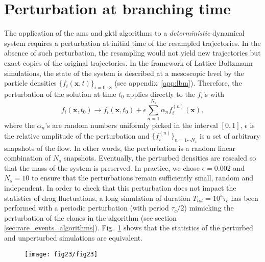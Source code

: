 \section{Perturbation at branching time}
\label{app:perturb_branching_time}
The application  of the \ac{ams} and \ac{gktl} algorithms to a \emph{deterministic} dynamical system requires a perturbation at initial time of the
resampled trajectories. In the absence of such perturbation, the resampling would not yield new trajectories but exact copies of the original trajectories.
In the framework of Lattice Boltzmann simulations, the state of the system is described at a mesoscopic level by the particle densities $\{f_i(\mathbf{x},t)\}_{i=0\cdots8}$ (see appendix~\ref{app:lbm}).
%
Therefore, the perturbation of the solution at time $t_0$ applies directly to the $f_i$'s with 
\begin{equation}
f_{i}(\mathbf{x},t_0) \longrightarrow f_i(\mathbf{x},t_0) + \epsilon \sum_{n=1}^{N_s} \alpha_{n}f_{i}^{(n)}(\mathbf{x}),
\label{eq:perturb_pop}
\end{equation}
where the $\alpha_n$'s are random numbers uniformly picked in the interval $[0,1]$, $\epsilon$ is the relative amplitude of the perturbation and $\{f_i^{(n)}\}_{n=1 \cdots N_s}$ is a set of arbitrary snapshots of the flow. 
%
In other words, the perturbation is a  random linear combination of $N_s$ snapshots.
Eventually, the perturbed densities are rescaled so that the mass of the system is preserved.
%
In practice, we chose $\epsilon = 0.002$ and $N_s = 10$ to ensure that the perturbations remain sufficiently small, random and independent.
%
In order to check that this perturbation does not impact the statistics of drag fluctuations, a long simulation of duration $T_{tot} = 10^5 \tau_c$ has been performed with a periodic perturbation (with period $\tau_c / 2$) mimicking the perturbation of the clones in the algorithm (see section \ref{sec:rare_events_algorithms}).
%
Fig.~\ref{fig:pdf_drag_with_perturbation} shows that the statistics of the perturbed and unperturbed simulations are equivalent.

\begin{figure}
  \centering
\texttt{[image: fig23/fig23]}
\caption{}
\label{fig:pdf_drag_with_perturbation}
\end{figure}
